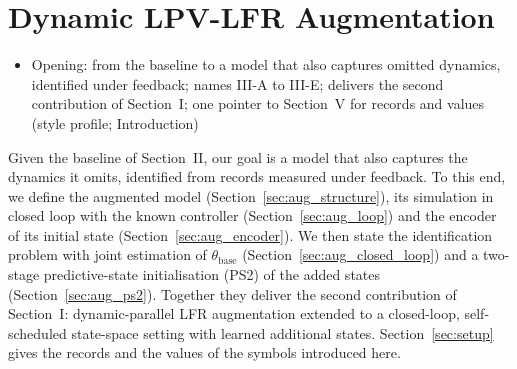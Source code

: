 \section{Dynamic LPV-LFR Augmentation}\label{sec:augmentation}
\ifdraft
\begin{itemize}
\item Opening: from the baseline to a model that also captures omitted dynamics, identified under feedback; names III-A to III-E; delivers the second contribution of Section~I; one pointer to Section~V for records and values (style profile; Introduction)
\end{itemize}
\fi

Given the baseline of Section~II, our goal is a model that also
captures the dynamics it omits, identified from records measured under
feedback.
To this end, we define the augmented model
(Section~\ref{sec:aug_structure}), its simulation in closed loop with the
known controller (Section~\ref{sec:aug_loop}) and the encoder of its initial
state (Section~\ref{sec:aug_encoder}).
We then state the identification problem with joint estimation of
$\theta_{\mathrm{base}}$ (Section~\ref{sec:aug_closed_loop}) and a two-stage
predictive-state initialisation (PS2) of the added states
(Section~\ref{sec:aug_ps2}).
Together they deliver the second contribution of Section~I: dynamic-parallel
LFR augmentation extended to a closed-loop, self-scheduled state-space
setting with learned additional states.
Section~\ref{sec:setup} gives the records and the values of the symbols
introduced here.

